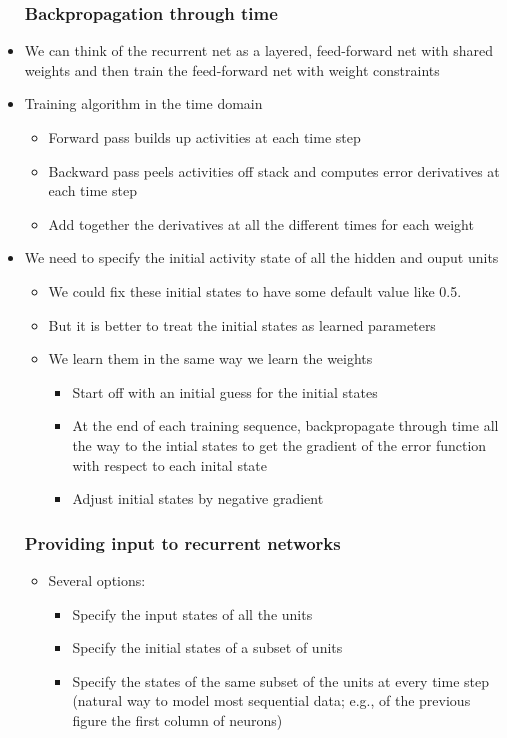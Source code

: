 \begin{itemize}
	\subsubsection{Backpropagation through time}
	\item We can think of the recurrent net as a layered, feed-forward net with shared weights and then train the feed-forward net with weight constraints
	\item Training algorithm in the time domain
	\begin{itemize}
		\item Forward pass builds up activities at each time step
		\item Backward pass peels activities off stack and computes error derivatives at each time step
		\item Add together the derivatives at all the different times for each weight
	\end{itemize}

	\item We need to specify the initial activity state of all the hidden and ouput units
	\begin{itemize}
		\item We could fix these initial states to have some default value like 0.5.
		\item But it is better to treat the initial states as learned parameters
		\item We learn them in the same way we learn the weights
		\begin{itemize}
			\item Start off with an initial guess for the initial states
			\item At the end of each training sequence, backpropagate through time all the way to the intial states to get the gradient of the error function with respect to each inital state
			\item Adjust initial states by negative gradient
		\end{itemize}
	\end{itemize}

	\subsubsection{Providing input to recurrent networks}
	\begin{itemize}
		\item Several options:
		\begin{itemize}
			\item Specify the input states of all the units
			\item Specify the initial states of a subset of units
			\item Specify the states of the same subset of the units at every time step (natural way to model most sequential data; e.g., of the previous figure the first column of neurons)
		\end{itemize}


\end{itemize}
\end{itemize}

